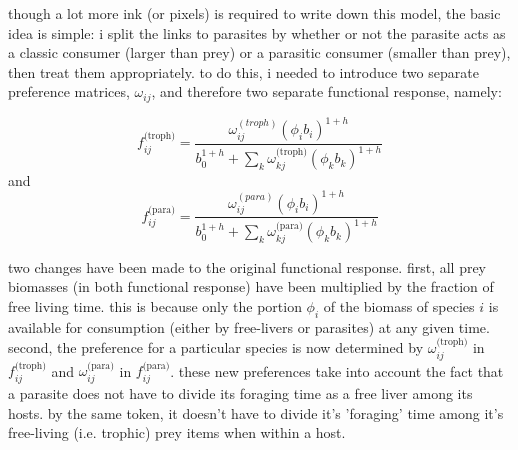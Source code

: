 \documentclass[11pt]{amsart}
\begin{document}
though a lot more ink (or pixels) is required to write down this model, the basic idea is simple: i split the links to parasites by whether or not the parasite acts as a classic consumer (larger than prey) or a parasitic consumer (smaller than prey), then treat them appropriately.  to do this, i needed to introduce two separate  preference matrices, $\omega_{ij}$, and therefore two separate functional response, namely:

\begin{equation}
f_{ij}^\text{(troph)} = \frac{\omega_{ij}^{(troph)}(\phi_ib_i)^{1+h}}{b_0^{1+h} + \sum_k\omega^\text{(troph)}_{kj}(\phi_kb_k)^{1+h}} \label{fr1troph}
\end{equation}
and
\begin{equation}
f_{ij}^\text{(para)} = \frac{\omega_{ij}^{(para)}(\phi_ib_i)^{1+h}}{b_0^{1+h} + \sum_k\omega^\text{(para)}_{kj}(\phi_kb_k)^{1+h}} \label{fr1para}
\end{equation}

two changes have been made to the original functional response.  first, all prey biomasses (in both functional response) have been multiplied by the fraction of free living time.  this is because only the portion $\phi_i$ of the biomass of species $i$ is available for consumption (either by free-livers or parasites) at any given time.  second, the preference for a particular species is now determined by $\omega_{ij}^\text{(troph)}$ in $f_{ij}^\text{(troph)}$ and $\omega_{ij}^\text{(para)}$ in $f_{ij}^\text{(para)}$.  these new preferences take into account the fact that a parasite does not have to divide its foraging time as a free liver among its hosts.  by the same token, it doesn't have to divide it's 'foraging' time among it's free-living (i.e. trophic) prey items when within a host.
\end{document}
